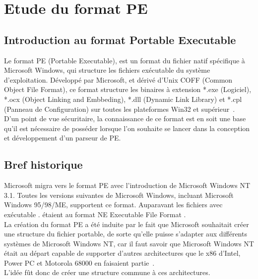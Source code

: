 \chapter{Etude du format PE}

\section{Introduction au format Portable Executable}
Le format PE (Portable Executable), est un format du fichier natif spécifique à Microsoft Windows, qui structure les fichiers exécutable du système d'exploitation. Développé par Microsoft, et dérivé d'Unix COFF (Common Object File Format), ce format structure les binaires à extension *.exe (Logiciel), *.ocx (Object Linking and Embbeding), *.dll (Dynamic Link Library) et *.cpl (Panneau de Configuration) sur toutes les plateformes Win32 et supérieur~\cite{wiki}.
\\

D'un point de vue sécuritaire, la connaissance de ce format est en soit une base qu'il est nécessaire de posséder lorsque l'on souhaite se lancer dans la conception et développement d'un parseur de PE.
\section{Bref historique}
Microsoft migra vers le format PE avec l'introduction de Microsoft Windows NT 3.1. Toutes les versions suivantes de Microsoft Windows, incluant Microsoft Windows 95/98/ME, supportent ce format. Auparavant les fichiers avec \og exécutable \fg. étaient au format NE \og Executable File Format \fg.\\
 La création du format PE a été induite par le fait que Microsoft souhaitait créer une structure du fichier portable, de sorte qu'elle puisse s'adapter aux différents systèmes de Microsoft Windows NT, car il faut savoir que Microsoft Windows NT était au départ capable de supporter d'autres architectures que le x86 d'Intel, Power PC et Motorola 68000 en faisaient partie~\cite{MS}.
\\
L'idée fût donc de créer une structure commune à ces architectures.

